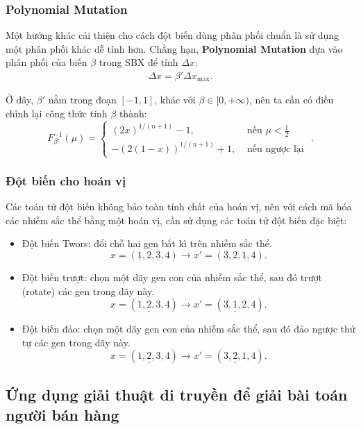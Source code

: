 \begin{frame}[fragile]
\frametitle{Polynomial Mutation}
Một hướng khác cải thiện cho cách đột biến dùng phân phối chuẩn là sử dụng một
phân phối khác dễ tính hơn. Chẳng hạn, \textbf{Polynomial Mutation} dựa vào phân
phối của biến \( \beta \) trong SBX để tính \( \Delta x \):
\begin{align*}
  \Delta x = \beta' \Delta x_{\text{max}}
.\end{align*}

Ở đây, \( \beta' \) nằm trong đoạn \( [-1, 1] \), khác với \( \beta \in [0,
+\infty) \), nên ta cần có điều chỉnh lại công thức tính \( \beta \) thành:
\[
  F^{-1}_{\beta'}(\mu) = \begin{cases}
    (2x)^{1 / (n+1)} - 1, &\text{ nếu }\mu < \frac{1}{2}\\
    -(2(1 - x))^{1 / (n+1)} + 1, &\text{ nếu ngược lại }
    
  \end{cases}
.\] 
\end{frame}

\begin{frame}[fragile]
\frametitle{Đột biến cho hoán vị}
Các toán tử đột biến không bảo toàn tính chất của hoán vị, nên với cách mã hóa
các nhiễm sắc thể bằng một hoán vị, cần sử dụng các toán tử đột biến đặc biệt:
\begin{itemize}
\item Đột biến Twors: đổi chỗ hai gen bất kì trên nhiễm sắc thể.
  \[
  x = (\underline{1}, 2, \underline{3}, 4) \to x' = (\underline{3}, 2,
  \underline{1}, 4)
  .\] 
\item Đột biến trượt: chọn một dãy gen con của nhiễm sắc thể, sau đó trượt
  (rotate) các gen trong dãy này.
  \[
    x = (\underline{1, 2, 3}, 4) \to x' = (\underline{3, 1, 2}, 4)
  .\] 
\item Đột biến đảo: chọn một dãy gen con của nhiễm sắc thể, sau đó đảo ngược thứ
  tự các gen trong dãy này.
  \[
    x = (\underline{1, 2, 3}, 4) \to x' = (\underline{3, 2, 1}, 4)
  .\] 
\end{itemize}
\end{frame}

\subsection{Ứng dụng giải thuật di truyền để giải bài toán người bán hàng} %
\label{sub:Ứng dụng giải thuật di truyền để giải bài toán người bán hàng}

